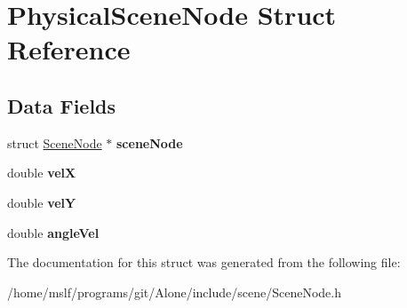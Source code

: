 \hypertarget{struct_physical_scene_node}{}\section{Physical\+Scene\+Node Struct Reference}
\label{struct_physical_scene_node}
\subsection*{Data Fields}
\begin{DoxyCompactItemize}
\item 
\hypertarget{struct_physical_scene_node_a423738fbe912b45f31f4d80af3aa244a}{}\label{struct_physical_scene_node_a423738fbe912b45f31f4d80af3aa244a} 
struct \hyperlink{struct_scene_node}{Scene\+Node} $\ast$ {\bfseries scene\+Node}
\item 
\hypertarget{struct_physical_scene_node_ab342837870f4b8ce8fd2bb48419e0600}{}\label{struct_physical_scene_node_ab342837870f4b8ce8fd2bb48419e0600} 
double {\bfseries velX}
\item 
\hypertarget{struct_physical_scene_node_a6dcefa93242bac42ac5433d1a219a1ad}{}\label{struct_physical_scene_node_a6dcefa93242bac42ac5433d1a219a1ad} 
double {\bfseries velY}
\item 
\hypertarget{struct_physical_scene_node_a312db103482db7bf9bf68f1ab9c5e0e1}{}\label{struct_physical_scene_node_a312db103482db7bf9bf68f1ab9c5e0e1} 
double {\bfseries angle\+Vel}
\end{DoxyCompactItemize}


The documentation for this struct was generated from the following file\+:\begin{DoxyCompactItemize}
\item 
/home/mslf/programs/git/\+Alone/include/scene/Scene\+Node.\+h\end{DoxyCompactItemize}
